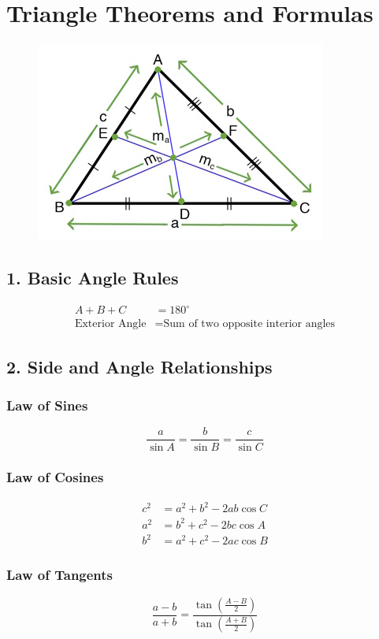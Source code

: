 \chapter{Triangle Theorems and Formulas}
\begin{figure}[H]
		\includegraphics[scale=1, center]{./image/Triangle-Formula.jpg}
\end{figure}
\section*{1. Basic Angle Rules}
\begin{align*}
A + B + C &= 180^\circ \\
\text{Exterior Angle} &= \text{Sum of two opposite interior angles}
\end{align*}

\section*{2. Side and Angle Relationships}
\subsection*{Law of Sines}
\[
\frac{a}{\sin A} = \frac{b}{\sin B} = \frac{c}{\sin C}
\]

\subsection*{Law of Cosines}
\begin{align*}
c^2 &= a^2 + b^2 - 2ab\cos C \\
a^2 &= b^2 + c^2 - 2bc\cos A \\
b^2 &= a^2 + c^2 - 2ac\cos B
\end{align*}

\subsection*{Law of Tangents}
\[
\frac{a - b}{a + b} = \frac{\tan\left(\frac{A - B}{2}\right)}{\tan\left(\frac{A + B}{2}\right)}
\]

